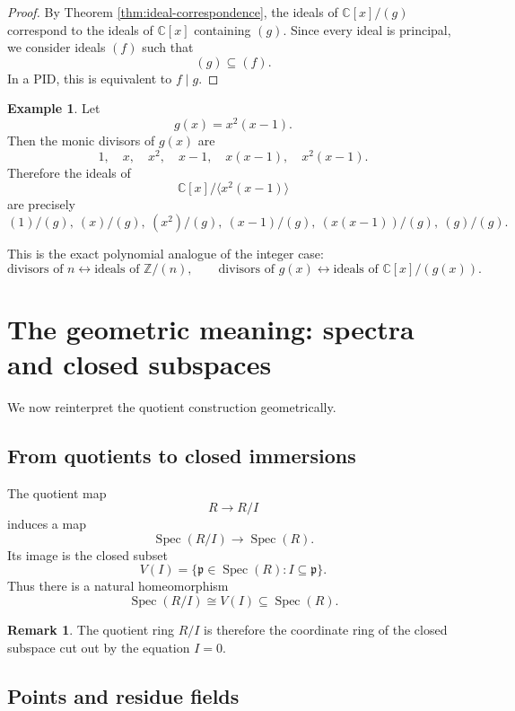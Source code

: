 \documentclass[11pt]{article}
\theoremstyle{definition}
\newtheorem{example}[theorem]{Example}
\newtheorem{remark}[theorem]{Remark}
\newcommand{\Z}{\mathbb{Z}}
\newcommand{\C}{\mathbb{C}}
\newcommand{\Spec}{\operatorname{Spec}}
\newcommand{\ideal}[1]{\langle #1\rangle}
\begin{document}
	\begin{proof}
		By Theorem \ref{thm:ideal-correspondence}, the ideals of \(\C[x]/(g)\) correspond to the ideals of \(\C[x]\) containing \((g)\). Since every ideal is principal, we consider ideals \((f)\) such that
		\[
		(g)\subseteq (f).
		\]
		In a PID, this is equivalent to \(f\mid g\).
	\end{proof}
	
	\begin{example}
		Let
		\[
		g(x)=x^2(x-1).
		\]
		Then the monic divisors of \(g(x)\) are
		\[
		1,\quad x,\quad x^2,\quad x-1,\quad x(x-1),\quad x^2(x-1).
		\]
		Therefore the ideals of
		\[
		\C[x]/\ideal{x^2(x-1)}
		\]
		are precisely
		\[
		(1)/(g),\ (x)/(g),\ (x^2)/(g),\ (x-1)/(g),\ (x(x-1))/(g),\ (g)/(g).
		\]
	\end{example}
	
	This is the exact polynomial analogue of the integer case:
	\[
	\boxed{
		\text{divisors of }n
		\longleftrightarrow
		\text{ideals of }\Z/(n),
		\qquad
		\text{divisors of }g(x)
		\longleftrightarrow
		\text{ideals of }\C[x]/(g(x)).
	}
	\]
	
	\section{The geometric meaning: spectra and closed subspaces}
	
	We now reinterpret the quotient construction geometrically.
	
	\subsection{From quotients to closed immersions}
	
	The quotient map
	\[
	R\to R/I
	\]
	induces a map
	\[
	\Spec(R/I)\to \Spec(R).
	\]
	Its image is the closed subset
	\[
	V(I)=\{\mathfrak p\in \Spec(R): I\subseteq \mathfrak p\}.
	\]
	Thus there is a natural homeomorphism
	\[
	\Spec(R/I)\cong V(I)\subseteq \Spec(R).
	\]
	
	\begin{remark}
		The quotient ring \(R/I\) is therefore the coordinate ring of the closed subspace cut out by the equation \(I=0\).
	\end{remark}
	
	\subsection{Points and residue fields}
	
\end{document}
